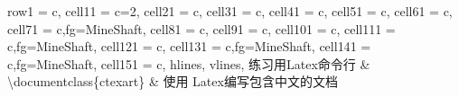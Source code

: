 \documentclass{ctexart}
\begin{document}
   
    \begin{longtblr}[
      label = none,
      entry = none,
    ]{
      row{1} = {c},
      cell{1}{1} = {c=2}{},
      cell{2}{1} = {c},
      cell{3}{1} = {c},
      cell{4}{1} = {c},
      cell{5}{1} = {c},
      cell{6}{1} = {c},
      cell{7}{1} = {c,fg=MineShaft},
      cell{8}{1} = {c},
      cell{9}{1} = {c},
      cell{10}{1} = {c},
      cell{11}{1} = {c,fg=MineShaft},
      cell{12}{1} = {c},
      cell{13}{1} = {c,fg=MineShaft},
      cell{14}{1} = {c,fg=MineShaft},
      cell{15}{1} = {c},
      hlines,
      vlines,
    }
    练习用Latex命令行                                                                                                                                                                                                                                                                                                                                                                                                                                                                                                                                                                                                                                                                                                                                                                                                                                                                                &                                      \\
    \textbackslash{}documentclass\{ctexart\}                                                                                                                                                                                                                                                                                                                                                                                                                                                                                                                                                                                                                                                                                                                                                                                                                                                   & 使用 Latex编写包含中文的文档                    \\

\end{longtblr}
\end{document}
